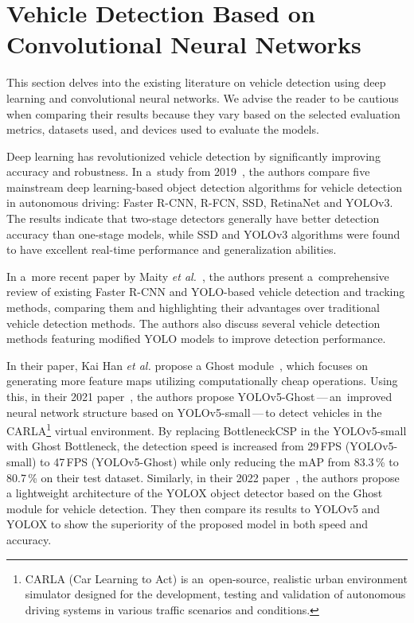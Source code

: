 \section{Vehicle Detection Based on Convolutional Neural Networks}

This section delves into the existing literature on vehicle detection using deep
learning and convolutional neural networks. We advise the reader to be cautious
when comparing their results because they vary based on the selected evaluation
metrics, datasets used, and devices used to evaluate the models.

Deep learning has revolutionized vehicle detection by significantly improving
accuracy and robustness. In a~study from 2019~\cite{Wang2019}, the authors
compare five mainstream deep learning-based object detection algorithms for
vehicle detection in autonomous driving: Faster R-CNN, R-FCN, SSD, RetinaNet
and YOLOv3. The results indicate that two-stage detectors generally have better
detection accuracy than one-stage models, while SSD and YOLOv3 algorithms were
found to have excellent real-time performance and generalization abilities. 

In a~more recent paper by Maity \textit{et al.}~\cite{Maity2021},
the authors present a~comprehensive review of existing Faster R-CNN and
YOLO-based vehicle detection and tracking methods, comparing them and
highlighting their advantages over traditional vehicle detection methods. The
authors also discuss several vehicle detection methods featuring modified YOLO
models to improve detection performance.

In their paper, Kai Han \textit{et al.} propose a Ghost module~\cite{Han2019},
which focuses on generating more feature maps utilizing computationally cheap
operations. Using this, in their 2021 paper~\cite{Wu2021}, the authors
propose YOLOv5-Ghost\,---\,an~improved neural network structure based on
YOLOv5-small\,---\,to detect vehicles in the CARLA\footnote{CARLA (Car Learning
to Act) is an~open-source, realistic urban environment simulator designed for
the development, testing and validation of autonomous driving systems in various
traffic scenarios and conditions.} virtual environment. By replacing
BottleneckCSP in the YOLOv5-small with Ghost Bottleneck, the detection speed is
increased from 29\,FPS (YOLOv5-small) to 47\,FPS (YOLOv5-Ghost) while only
reducing the mAP from \num{83.3}\,\% to \num{80.7}\,\% on their test dataset.
Similarly, in their 2022 paper~\cite{Xiong2022}, the authors propose a
lightweight architecture of the YOLOX object detector based on the Ghost module
for vehicle detection. They then compare its results to YOLOv5 and YOLOX to show
the superiority of the proposed model in both speed and accuracy.

